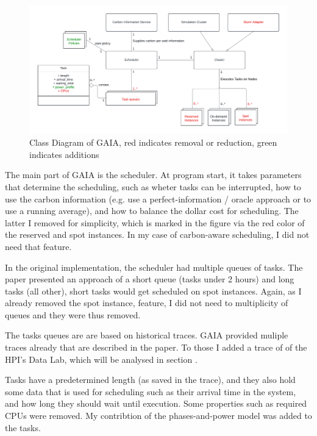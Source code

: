 \begin{figure}
    \includegraphics[width=\linewidth]{images/MA Thesis Diagram.pdf}
    \caption{Class Diagram of GAIA, red indicates removal or reduction, green indicates additions}
    \label{fig:class_diagram}
\end{figure}

The main part of GAIA is the scheduler. At program start, it takes parameters that determine the scheduling, such as wheter tasks can be interrupted, how to use the carbon information (e.g. use a perfect-information / oracle approach or to use a running average), and how to balance the dollar cost for scheduling. 
The latter I removed for simplicity, which is marked in the figure via the red color of the reserved and spot instances. In my case of carbon-aware scheduling, I did not need that feature.

In the original implementation, the scheduler had multiple queues of tasks. 
The paper presented an approach of a short queue (tasks under 2 hours) and long tasks (all other), short tasks would get scheduled on spot instances. 
Again, as I already removed the spot instance, feature, I did not need to multiplicity of queues and they were thus removed. 

The tasks queues are are based on historical traces. GAIA provided muliple traces already that are described in the paper. To those I added a trace of of the HPI's Data Lab, which will be analysed in section .

Tasks have a predetermined length (as saved in the trace), and they also hold some data that is used for scheduling such as their arrival time in the system, and how long they should wait until execution. 
Some properties such as required CPUs were removed.
My contribtion of the phases-and-power model was added to the tasks.

